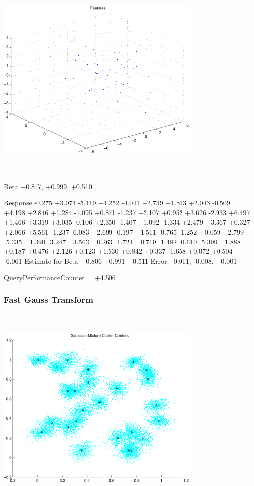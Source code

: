 \documentclass[9pt]{article}
\theoremstyle{plain}
\theoremstyle{definition}
\theoremstyle{remark}
\numberwithin{equation}{section}
\begin{document}
\includegraphics[width=10.0cm,height=10.0cm]{regression_features.pdf}

Beta
+0.817, +0.999, +0.510

Response
-0.275
+3.076
-5.119
+1.252
-4.041
+2.739
+1.813
+2.043
-0.509
+4.198
+2.846
+1.284
-1.095
+0.871
-1.237
+2.107
+0.952
+3.626
-2.933
+6.497
+1.466
+3.319
+3.035
-0.106
+2.350
-1.407
+1.092
-1.334
+2.479
+3.367
+0.327
+2.066
+5.561
-1.237
-6.083
+2.699
-0.197
+1.511
-0.765
-1.252
+0.059
+2.799
-5.335
+1.390
-3.247
+3.563
+0.263
-1.724
+0.719
-1.482
-0.610
-5.399
+1.888
+0.187
+0.476
+2.126
+0.123
+1.530
+0.842
+0.337
-1.658
+0.072
+0.504
-6.061
Estimate for Beta
+0.806
+0.991
+0.511
Error:
-0.011, -0.008, +0.001


QueryPerformanceCounter  =  +4.506
\subsubsection{Fast Gauss Transform}
\includegraphics[width=10.0cm,height=10.0cm]{GaussianMixture_ClusterCenters25_Centers.pdf}
\end{document}
